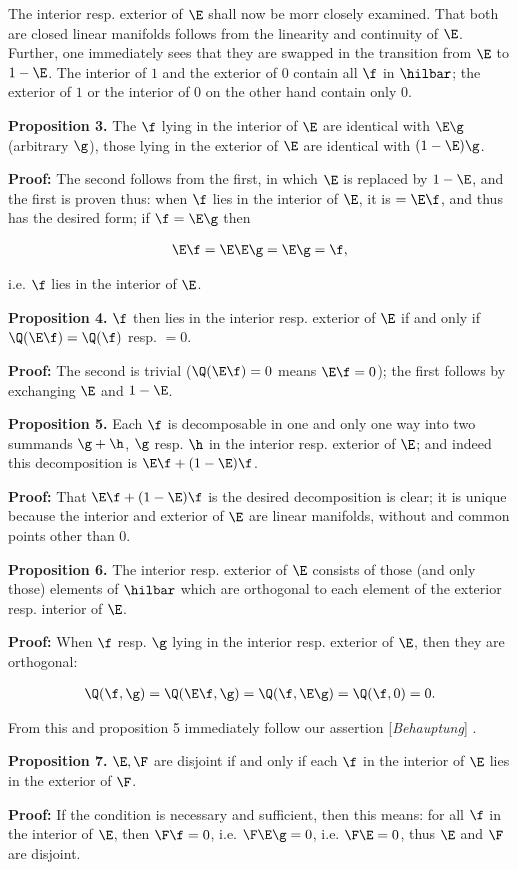 \documentclass{article}
\newcommand{\WTF}[1]{
[\it{\small{#1}}]
}
\newcommand{\uequ}[1]{
\begin{align*}
#1
\end{align*}
}
\renewcommand{\it}[1]{\textit{#1}}
\begin{document}
The interior resp. exterior of $\E$ shall now be morr closely examined. That both are closed linear manifolds follows from the linearity and continuity of $\E$. Further, one immediately sees that they are swapped in the transition from $\E$ to $1-\E$. The interior of $1$ and the exterior of $0$ contain all $\f$ in $\hilbar$; the exterior of $1$ or the interior of $0$ on the other hand contain only $0$.

\textbf{Proposition 3.} The $\f$ lying in the interior of $\E$ are identical with $\E\g$ (arbitrary $\g$), those lying in the exterior of $\E$ are identical with $(1-\E)\g$.

\textbf{Proof:} The second follows from the first, in which $\E$ is replaced by $1-\E$, and the first is proven thus: when $\f$ lies in the interior of $\E$, it is $=\E\f$, and thus has the desired form; if $\f=\E\g$ then
\uequ{
\E\f = \E\E\g = \E\g = \f,
}
i.e. $\f$ lies in the interior of $\E$.

\textbf{Proposition 4.} $\f$ then lies in the interior resp. exterior of $\E$ if and only if $\Q(\E\f) = \Q(\f)$ resp. $=0$.

\textbf{Proof:} The second is trivial ($\Q(\E\f)=0$ means $\E\f=0$); the first follows by exchanging $\E$ and $1-\E$.

\textbf{Proposition 5.} Each $\f$ is decomposable in one and only one way into two summands $\g+\h$, $\g$ resp. $\h$ in the interior resp. exterior of $\E$; and indeed this decomposition is $\E\f + (1-\E)\f$.

\textbf{Proof:} That $\E\f + (1-\E)\f$ is the desired decomposition is clear; it is unique because the interior and exterior of $\E$ are linear manifolds, without and common points other than $0$.

\textbf{Proposition 6.} The interior resp. exterior of $\E$ consists of those (and only those) elements of $\hilbar$ which are orthogonal to each element of the exterior resp. interior of $\E$.

\textbf{Proof:} When $\f$ resp. $\g$ lying in the interior resp. exterior of $\E$, then they are orthogonal:
\uequ{
\Q(\f,\g)=\Q(\E\f,\g)=\Q(\f,\E\g) = \Q(\f,0) = 0.
}
From this and proposition 5 immediately follow our assertion\WTF{Behauptung}.

\textbf{Proposition 7.} $\E,\F$ are disjoint if and only if each $\f$ in the interior of $\E$ lies in the exterior of $\F$.

\textbf{Proof:} If the condition is necessary and sufficient, then this means: for all $\f$ in the interior of $\E$, then $\F\f=0$, i.e. $\F\E\g=0$, i.e. $\F\E=0$, thus $\E$ and $\F$ are disjoint.
\end{document}

